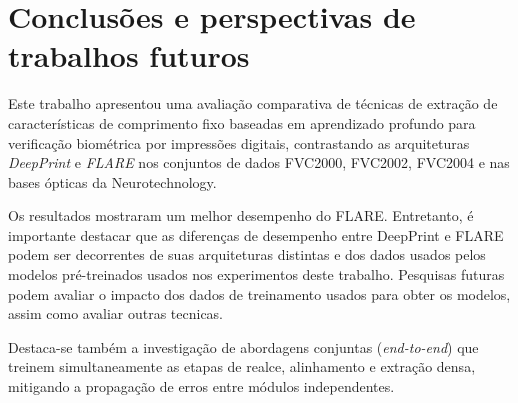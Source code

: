 \section{Conclusões e perspectivas de trabalhos futuros}\label{sec:conclusao}


Este trabalho apresentou uma avaliação comparativa de técnicas de extração de características de comprimento fixo baseadas em aprendizado profundo para verificação biométrica por impressões digitais, contrastando as arquiteturas \textit{DeepPrint} e \textit{FLARE} nos conjuntos de dados FVC2000, FVC2002, FVC2004 e nas bases ópticas da Neurotechnology.

Os resultados mostraram um melhor desempenho do FLARE. Entretanto, é importante destacar que as diferenças de desempenho entre DeepPrint e FLARE podem ser decorrentes de suas arquiteturas distintas e dos dados usados pelos modelos pré-treinados usados nos experimentos deste trabalho. Pesquisas futuras podem avaliar o impacto dos dados de treinamento usados para obter os modelos, assim como avaliar outras tecnicas.

Destaca-se também a investigação de abordagens conjuntas (\textit{end-to-end}) que treinem simultaneamente as etapas de realce, alinhamento e extração densa, mitigando a propagação de erros entre módulos independentes.

